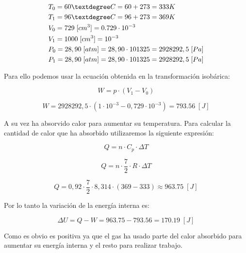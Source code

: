 \documentclass{article}
\begin{document}
\begin{equation}
    \begin{split}
        & T_0 = 60 \textdegree C = 60 + 273 = 333 K  \\
        & T_1 = 96 \textdegree C = 96 + 273 = 369 K  \\
        & V_0 = 729 \; [cm^3] = 0.729 \cdot 10^{-3} \; \\
        & V_1 = 1000 \; [cm^3] = 10^{-3} \; \\
        & P_0 = 28,90 \; [atm] = 28,90 \cdot 101325 = 2928292,5 \; [Pa] \\
        & P_1 = 28,90 \; [atm] = 28,90 \cdot 101325 = 2928292,5 \; [Pa] \\
    \end{split}
\end{equation}

Para ello podemos usar la ecuación obtenida en la transformación isobárica:

\begin{equation}
    W = p \cdot (V_1 - V_0)
\end{equation}

\begin{equation}
    W = 2928292,5 \cdot (1 \cdot 10^{-3} - 0,729 \cdot 10^{-3}) = 793.56 \; [J]
\end{equation}

A su vez ha absorvido calor para aumentar su temperatura. Para calcular la cantidad de calor que ha absorbido utilizaremos la siguiente expresión:

\begin{equation}
    Q = n \cdot C_p \cdot \Delta T
\end{equation}

\begin{equation}
    Q = n \cdot \frac{7}{2} \cdot R \cdot \Delta T
\end{equation}

\begin{equation}
    Q = 0,92 \cdot \frac{7}{2} \cdot 8,314 \cdot (369 - 333) \approx 963.75 \; [J]
\end{equation}


Por lo tanto la variación de la energía interna es:

\begin{equation}
    \Delta U = Q - W = 963.75 - 793.56 = 170.19 \; [J]
\end{equation}

Como es obvio es positiva ya que el gas ha usado parte del calor absorbido para aumentar su energía interna y el resto para realizar trabajo.
\end{document}
